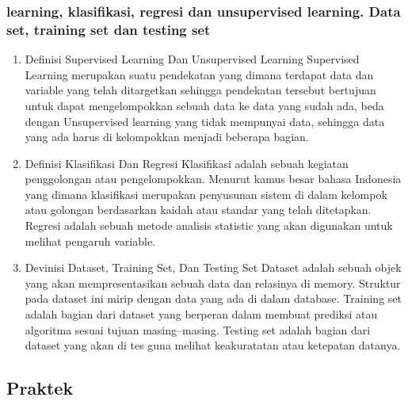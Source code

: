 	\subsubsection{learning, klasiﬁkasi, regresi dan unsupervised learning. Data set, training set dan testing set}
	\begin{enumerate}
	\item
	Definisi Supervised Learning Dan Unsupervised Learning
	\subitem
	Supervised Learning merupakan suatu pendekatan yang dimana terdapat data dan variable yang telah ditargetkan sehingga pendekatan tersebut bertujuan untuk dapat mengelompokkan sebuah data ke data yang sudah ada, beda dengan Unsupervised learning yang tidak mempunyai data, sehingga data yang ada harus di kelompokkan menjadi beberapa bagian.
	\item
	Definisi  Klasifikasi Dan Regresi
	\subitem
	Klasifikasi adalah sebuah kegiatan penggolongan atau pengelompokkan. Menurut kamus besar bahasa Indonesia yang dimana klasifikasi merupakan penyusunan sistem di dalam kelompok atau golongan berdasarkan kaidah atau standar yang telah ditetapkan. Regresi adalah sebuah metode analisis statistic yang akan digunakan untuk melihat pengaruh variable.
	\item
	Devinisi Dataset, Training Set, Dan Testing Set
	\subitem
	Dataset adalah sebuah objek yang akan mempresentasikan sebuah data dan relasinya di memory. Struktur pada dataset ini mirip dengan data yang ada di dalam database. Training set adalah bagian dari dataset yang berperan dalam membuat prediksi atau algoritma sesuai tujuan masing–masing. Testing set adalah bagian dari dataset yang akan di tes guna melihat keakuratatan atau ketepatan datanya.
	\end{enumerate}

\subsection{Praktek}
